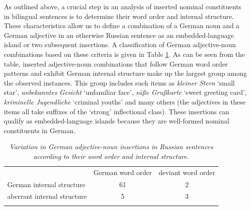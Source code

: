 As outlined above, a crucial step in an analysis of inserted nominal constituents in bilingual sentences is to determine their word order and internal structure. These characteristics allow us to define a combination of a German noun and a German adjective in an otherwise Russian sentence as an embedded-language island or two subsequent insertions. A classification of German adjective-noun combinations based on these criteria is given in Table \ref{tab:4:2}. As can be seen from the table, inserted adjective-noun combinations that follow German word order patterns and exhibit German internal structure make up the largest group among the observed instances. This group includes such items as \textit{kleiner Stern} `small star', \textit{unbekanntes Gesicht} `unfamiliar face', \textit{süße Grußkarte} `sweet greeting card', \textit{kriminelle Jugendliche} `criminal youths' and many others (the adjectives in these items all take suffixes of the `strong' inflectional class). These insertions can qualify as embedded-language islands because they are well-formed nominal constituents in German.

\begin{table}
\begin{small}
\begin{tabularx}{\textwidth}{l c c}

\midrule
	\addlinespace[2mm]
	    & German word order	& deviant word order\\ 
	\addlinespace[2mm] 
	\midrule
	\addlinespace[2mm]
	German internal structure	& 61	& 2	\\
	
	\addlinespace[2mm]
	aberrant internal structure & 5	& 3\\
	\addlinespace[2mm]
	\midrule
		
	\end{tabularx}
\end{small}
	\caption{\textit{Variation in German adjective-noun insertions in Russian sentences according to their word order and internal structure.}} \label{tab:4:2}
\end{table}

